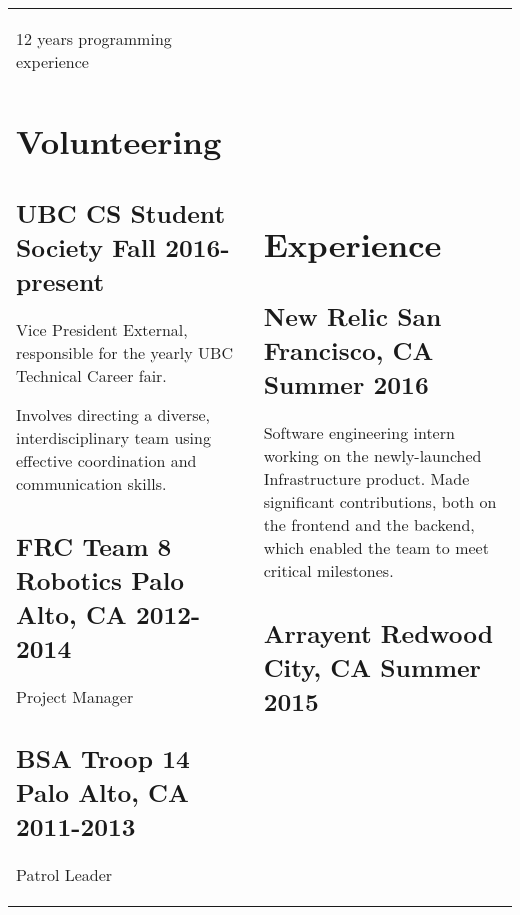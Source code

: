 \documentclass[letterpaper]{article}
\newlength{\leftcol}
\newlength{\rightcol}
\newcommand{\subtitle}{\normalfont\sffamily\color{black}\large}
\begin{document}
\begin{tabularx}{\textwidth}{@{}p{\leftcol} p{\rightcol}}
12 years programming experience

\section*{Volunteering}

\subsection*{UBC CS Student Society \newline\subtitle Fall 2016-present}

Vice President External, responsible for the yearly UBC Technical Career fair.

\vspace*{.5\baselineskip}

Involves directing a diverse, interdisciplinary team using effective
coordination and communication skills.

\subsection*{FRC Team 8 Robotics \newline\subtitle Palo Alto, CA 2012-2014}

Project Manager

\subsection*{BSA Troop 14 \newline\subtitle Palo Alto, CA 2011-2013}

Patrol Leader

&

\vspace*{2pt}

\section*{Experience}


\subsection*{New Relic \subtitle San Francisco, CA Summer 2016}

Software engineering intern working on the newly-launched Infrastructure
product. Made significant contributions, both on the frontend and the backend,
which enabled the team to meet critical milestones.

\subsection*{Arrayent \subtitle Redwood City, CA Summer 2015}


\end{tabularx}
\end{document}
